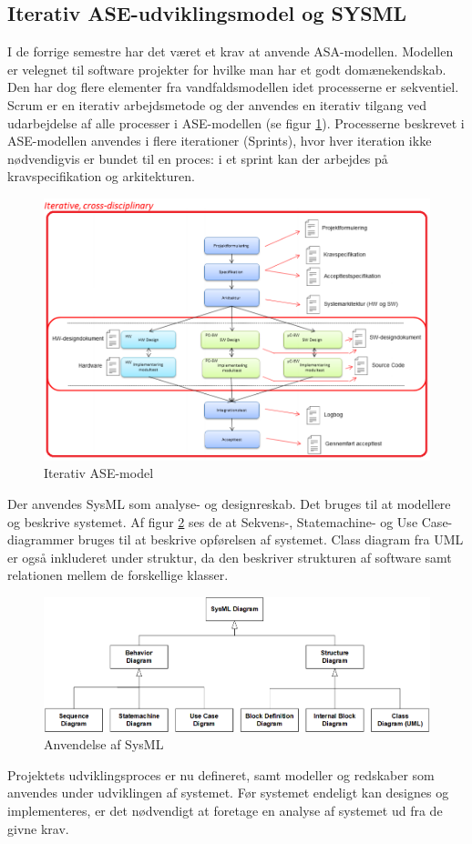 \documentclass[Rapport/Rapport_main.tex]{subfiles}
\begin{document}
\subsection{Iterativ ASE-udviklingsmodel og SYSML}
I de forrige semestre har det været et krav at anvende ASA-modellen. Modellen er velegnet til software projekter for hvilke man har et godt domænekendskab. Den har dog flere elementer fra vandfaldsmodellen idet processerne er sekventiel\cite{ASE}. Scrum er en iterativ arbejdsmetode og der anvendes en iterativ tilgang ved udarbejdelse af alle processer i ASE-modellen (se figur \ref{fig:ASE}). Processerne beskrevet i ASE-modellen anvendes i flere iterationer (Sprints), hvor hver iteration ikke nødvendigvis er bundet til en proces: i et sprint kan der arbejdes på kravspecifikation og arkitekturen. 
\begin{figure}[H]
    \centering
    \includegraphics[width=\textwidth]{Rapport/Metode_og_Proces/grahpics/iterativASE.png}
    \caption{Iterativ ASE-model}
    \label{fig:ASE}
\end{figure}
Der anvendes SysML som analyse- og designreskab. Det bruges til at modellere og beskrive systemet. Af figur \ref{fig:Sysml_usage} ses de at Sekvens-, Statemachine- og Use Case-diagrammer bruges til at beskrive opførelsen af systemet. Class diagram fra UML er også inkluderet under struktur, da den beskriver strukturen af software samt relationen mellem de forskellige klasser. 
\begin{figure}[H]
    \centering
    \includegraphics[width=\textwidth]{ProcesDokument/graphics/Sysml_usage.png}
    \caption{Anvendelse af SysML}
    \label{fig:Sysml_usage}
\end{figure}
Projektets udviklingsproces er nu defineret, samt modeller og redskaber som anvendes under udviklingen af systemet. Før systemet endeligt kan designes og implementeres, er det nødvendigt at foretage en analyse af systemet ud fra de givne krav.
\end{document}
